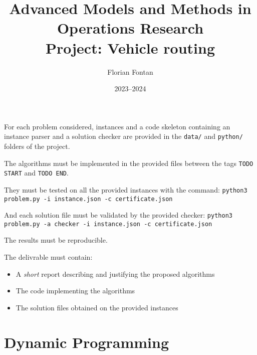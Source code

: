 \documentclass[a4paper,twocolumn]{article}
\author{Florian Fontan}
\title{Advanced Models and Methods in Operations Research \\ Project: Vehicle routing}
\date{2023--2024}
\begin{document}
\maketitle

For each problem considered, instances and a code skeleton containing an instance parser and a solution checker are provided in the \texttt{data/} and \texttt{python/} folders of the project.

The algorithms must be implemented in the provided files between the tags \texttt{TODO START} and \texttt{TODO END}.

They must be tested on all the provided instances with the command:
\texttt{python3 problem.py -i instance.json -c certificate.json}

And each solution file must be validated by the provided checker:
\texttt{python3 problem.py -a checker -i instance.json -c certificate.json}

The results must be reproducible.

\bigskip

The delivrable must contain:
\begin{itemize}
  \item A \emph{short} report describing and justifying the proposed algorithms
  \item The code implementing the algorithms
  \item The solution files obtained on the provided instances
\end{itemize}

\section{Dynamic Programming}
\end{document}
